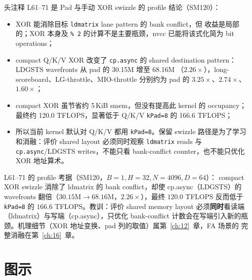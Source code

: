 头注释 L61--71 是 Pad 与手动 XOR swizzle 的 profile 结论（SM120）：
\begin{itemize}
  \item XOR 能消除目标 \texttt{ldmatrix} lane pattern 的 bank conflict，但
        收益是局部的；XOR 本身及 \texttt{\% 2} 的计算不是主要瓶颈，nvcc
        已能将该式化简为 bit operations；
  \item compact Q/K/V XOR 改变了 \texttt{cp.async} 的 shared destination
        pattern：LDGSTS wavefronts 从 pad 的 30.15M 增至 68.16M
        （$2.26\times$），long-scoreboard、LG-throttle、MIO-throttle 分别约为
        pad 的 $3.25\times$、$2.74\times$、$1.60\times$；
  \item compact XOR 虽节省约 5\,KiB smem，但没有提高此 kernel 的 occupancy；
        最终约 120.0 TFLOPS，显著低于 Q/K/V \texttt{kPad=8} 的 166.6
        TFLOPS；
  \item 所以当前 kernel 默认对 Q/K/V 都用 \texttt{kPad=8}。保留 swizzle
        路径是为了学习和消融：评价 shared layout 必须同时观察
        \texttt{ldmatrix} reads 与 \texttt{cp.async}/LDGSTS writes，不能只看
        bank-conflict counter，也不能只优化 XOR 地址算术。
\end{itemize}

L61--71 的 profile 考据（SM120，$B{=}1, H{=}32, N{=}4096, D{=}64$）：
compact XOR swizzle 消除了 ldmatrix 的 bank conflict，却使 cp.async（LDGSTS）的
wavefronts 翻倍（$30.15\mathrm{M} \to 68.16\mathrm{M}$，$2.26\times$），最终
$120.0$ TFLOPS 反而低于 \texttt{kPad=8} 的 $166.6$ TFLOPS。教训：评价 shared memory
layout 必须\textbf{同时}看读端（ldmatrix）与写端（cp.async），只优化 bank-conflict
计数会在写端引入新的瓶颈。机理细节（XOR 地址变换、pad 列的取值）属第~\ref{ch:12}~章，FA 场景的
完整消融在第~\ref{ch:16}~章。

\needspace{134mm}

\section{图示}

